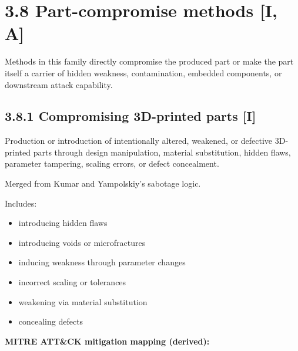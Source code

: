 \documentclass[10pt,a4paper,oneside]{report}
\begin{document}
\section{3.8 Part-compromise methods [I, A]}


Methods in this family directly compromise the produced part or make the part itself a carrier of hidden weakness, contamination, embedded components, or downstream attack capability.


\subsection{3.8.1 Compromising 3D-printed parts [I]}


Production or introduction of intentionally altered, weakened, or defective 3D-printed parts through design manipulation, material substitution, hidden flaws, parameter tampering, scaling errors, or defect concealment.

Merged from Kumar and Yampolskiy's sabotage logic.

Includes:

\begin{itemize}
\item introducing hidden flaws
\item introducing voids or microfractures
\item inducing weakness through parameter changes
\item incorrect scaling or tolerances
\item weakening via material substitution
\item concealing defects
\end{itemize}

\textbf{MITRE ATT\&CK mitigation mapping (derived):}
\end{document}
